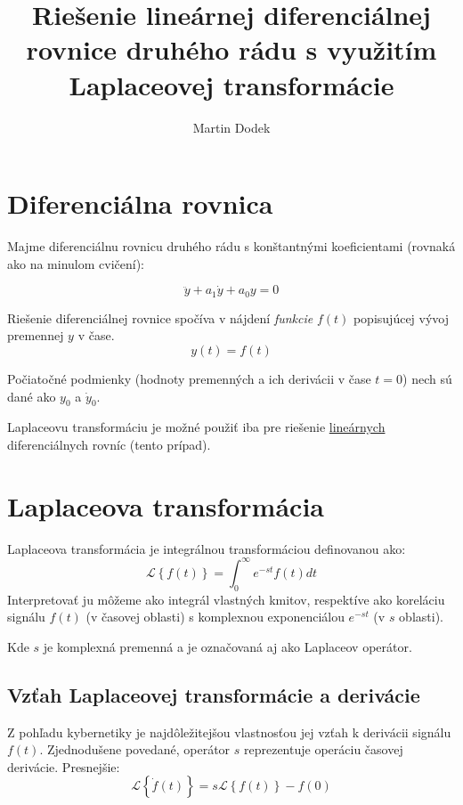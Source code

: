 \documentclass[a4paper,10pt]{article}
\begin{document}
\title{Riešenie lineárnej diferenciálnej rovnice druhého rádu s využitím Laplaceovej transformácie}
\author{Martin Dodek}
\pagestyle{plain}
\maketitle

\section{Diferenciálna rovnica}
Majme diferenciálnu rovnicu druhého rádu s konštantnými koeficientami (rovnaká ako na minulom cvičení):

\begin{equation}
\label{eq:diff_eq}
\ddot{y}+a_1\dot{y}+a_0y=0
\end{equation}

Riešenie diferenciálnej rovnice spočíva v nájdení \emph{funkcie} $f(t)$ popisujúcej vývoj premennej $y$ v čase.
\begin{equation*}
	y(t)=f(t)
\end{equation*}

Počiatočné podmienky (hodnoty premenných a ich derivácii v čase $t=0$) nech sú dané ako $y_0$ a $\dot{y}_0$.

Laplaceovu transformáciu je možné použiť iba pre riešenie \underline{lineárnych} diferenciálnych rovníc (tento prípad).

\section{Laplaceova transformácia}
Laplaceova transformácia je integrálnou transformáciou definovanou ako:
\begin{equation}
\label{eq:LPT}
 \mathcal{L}\left\lbrace f(t)\right\rbrace=\int_{0}^{\infty}{e^{-st}f(t)dt}
\end{equation}
Interpretovať ju môžeme ako integrál vlastných kmitov, respektíve ako koreláciu signálu $f(t)$ (v časovej oblasti) s komplexnou exponenciálou $e^{-st}$ (v $s$ oblasti).

Kde $s$ je komplexná premenná a je označovaná aj ako Laplaceov operátor.

\pagebreak

\subsection{Vzťah Laplaceovej transformácie a derivácie}
Z pohľadu kybernetiky je najdôležitejšou vlastnosťou jej vzťah k derivácii signálu $f(t)$.
Zjednodušene povedané, operátor $s$ reprezentuje operáciu časovej derivácie.
Presnejšie:
\begin{equation}
\label{eq:LPT prva derivacia}
	\mathcal{L}\left\lbrace\dot{f}(t) \right\rbrace=s\mathcal{L}\left\lbrace f(t)\right\rbrace-f(0)
\end{equation}
\end{document}
